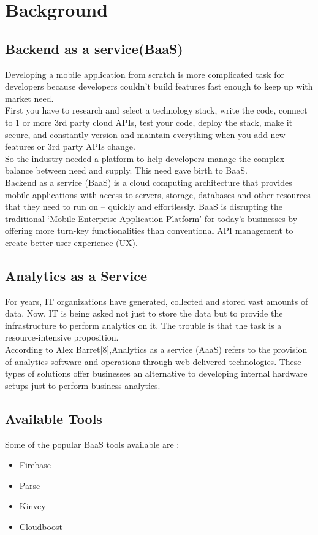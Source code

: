 \documentclass[a4paper,12pt]{report}
\begin{document}
    
    
    \chapter {Background}            
    \section{Backend as a service(BaaS)}    
    Developing a mobile application from scratch is more complicated task for developers because developers couldn’t build features fast enough to keep up with market need. \\
    First you have to research and select a technology stack, write the code, connect to 1 or more 3rd party cloud APIs, test your code, deploy the stack, make it secure, and constantly version and maintain everything when you add new features or 3rd party APIs change. \\
    So the industry needed a platform to help developers manage the complex balance between need and supply. This need gave birth to BaaS. \\    
    Backend as a service (BaaS) is a cloud computing architecture that provides mobile applications with access to servers, storage, databases and other resources that they need to run on – quickly and effortlessly. BaaS is disrupting the traditional ‘Mobile Enterprise Application Platform’ for today’s businesses by offering more turn-key functionalities than conventional API management to create better user experience (UX). \\
    
    \section{Analytics as a Service}    
    For years, IT organizations have generated, collected and stored vast amounts of data. Now, IT is being asked not just to store the data but to provide the infrastructure to perform analytics on it. The trouble is that the task is a resource-intensive proposition. \\    
    According to Alex Barret[8],Analytics as a service (AaaS) refers to the provision of analytics software and operations through web-delivered technologies. These types of solutions offer businesses an alternative to developing internal hardware setups just to perform business analytics. \\
    \section{Available Tools}
    Some of the popular BaaS tools available are :
    \begin{itemize}
    \item Firebase
    \item Parse
    \item Kinvey
    \item Cloudboost
    \end{itemize}
    
\end{document}

